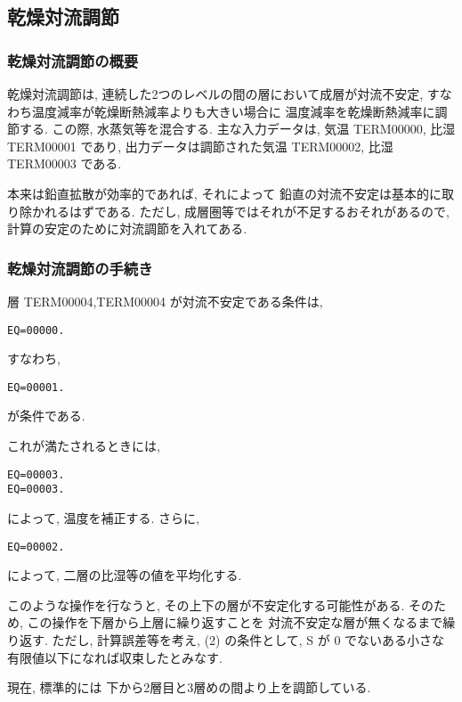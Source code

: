 ﻿
\subsection{乾燥対流調節}

\subsubsection{乾燥対流調節の概要}

乾燥対流調節は, 
連続した2つのレベルの間の層において成層が対流不安定, 
すなわち温度減率が乾燥断熱減率よりも大きい場合に
温度減率を乾燥断熱減率に調節する. この際, 水蒸気等を混合する.
主な入力データは, 気温 TERM00000, 比湿 TERM00001 であり,
出力データは調節された気温 TERM00002, 比湿 TERM00003 である.

本来は鉛直拡散が効率的であれば, それによって
鉛直の対流不安定は基本的に取り除かれるはずである.
ただし, 成層圏等ではそれが不足するおそれがあるので,
計算の安定のために対流調節を入れてある.

\subsubsection{乾燥対流調節の手続き}

層 TERM00004,TERM00004 が対流不安定である条件は,
%
\begin{verbatim}
EQ=00000.
\end{verbatim}
%
すなわち,
\begin{verbatim}
EQ=00001.
\end{verbatim}
が条件である.

これが満たされるときには,
\begin{verbatim}
EQ=00003.
EQ=00003.
\end{verbatim}
によって, 温度を補正する.
さらに,
\begin{verbatim}
EQ=00002.
\end{verbatim}
によって, 二層の比湿等の値を平均化する.

このような操作を行なうと,
その上下の層が不安定化する可能性がある. そのため,
この操作を下層から上層に繰り返すことを
対流不安定な層が無くなるまで繰り返す.
ただし, 計算誤差等を考え, 
(2) の条件として,
S が 0 でないある小さな有限値以下になれば収束したとみなす.

現在, 標準的には 下から2層目と3層めの間より上を調節している.


